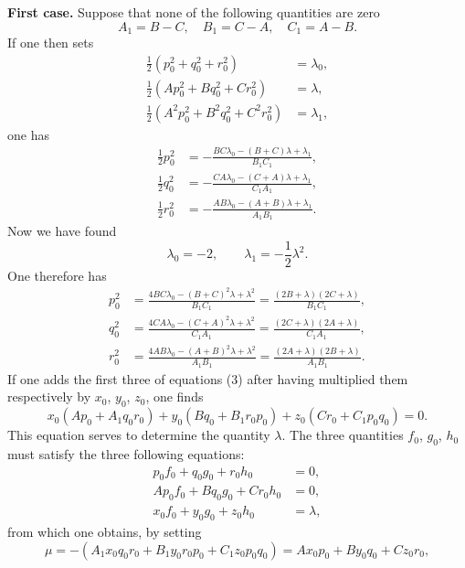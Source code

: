 \documentclass{article}
\begin{document}
\textbf{First case.} Suppose that none of the following quantities are zero
\[
A_1 = B - C, \quad B_1 = C - A, \quad C_1 = A - B.
\]
If one then sets
\begin{align*}
\frac{1}{2}(p_0^2 + q_0^2 + r_0^2) &= \lambda_0, \\
\frac{1}{2}(Ap_0^2 + Bq_0^2 + Cr_0^2) &= \lambda, \\
\frac{1}{2}(A^2p_0^2 + B^2q_0^2 + C^2r_0^2) &= \lambda_1,
\end{align*}
one has
\begin{align*}
\frac{1}{2}p_0^2 &= -\frac{BC\lambda_0 - (B + C)\lambda + \lambda_1}{B_1C_1}, \\
\frac{1}{2}q_0^2 &= -\frac{CA\lambda_0 - (C + A)\lambda + \lambda_1}{C_1A_1}, \\
\frac{1}{2}r_0^2 &= -\frac{AB\lambda_0 - (A + B)\lambda + \lambda_1}{A_1B_1}.
\end{align*}
Now we have found
\[
\lambda_0 = -2, \qquad \lambda_1 = -\frac{1}{2}\lambda^2.
\]
One therefore has
\begin{equation}
\begin{aligned}
p_0^2 &= \frac{4BC\lambda_0 - (B + C)^2\lambda + \lambda^2}{B_1C_1} = \frac{(2B + \lambda)(2C + \lambda)}{B_1C_1}, \\
q_0^2 &= \frac{4CA\lambda_0 - (C + A)^2\lambda + \lambda^2}{C_1A_1} = \frac{(2C + \lambda)(2A + \lambda)}{C_1A_1}, \\
r_0^2 &= \frac{4AB\lambda_0 - (A + B)^2\lambda + \lambda^2}{A_1B_1} = \frac{(2A + \lambda)(2B + \lambda)}{A_1B_1}.
\end{aligned}
\end{equation}
If one adds the first three of equations (3) after having multiplied them respectively by $x_0$, $y_0$, $z_0$, one finds
\begin{equation}
x_0(Ap_0 + A_1q_0r_0) + y_0(Bq_0 + B_1r_0p_0) + z_0(Cr_0 + C_1p_0q_0) = 0.
\end{equation}
This equation serves to determine the quantity $\lambda$.
The three quantities $f_0$, $g_0$, $h_0$ must satisfy the three following equations:
\begin{align*}
p_0f_0 + q_0g_0 + r_0h_0 &= 0, \\
Ap_0f_0 + Bq_0g_0 + Cr_0h_0 &= 0, \\
x_0f_0 + y_0g_0 + z_0h_0 &= \lambda,
\end{align*}
from which one obtains, by setting
\[
\mu = -(A_1x_0q_0r_0 + B_1y_0r_0p_0 + C_1z_0p_0q_0) = Ax_0p_0 + By_0q_0 + Cz_0r_0,
\]
\end{document}
